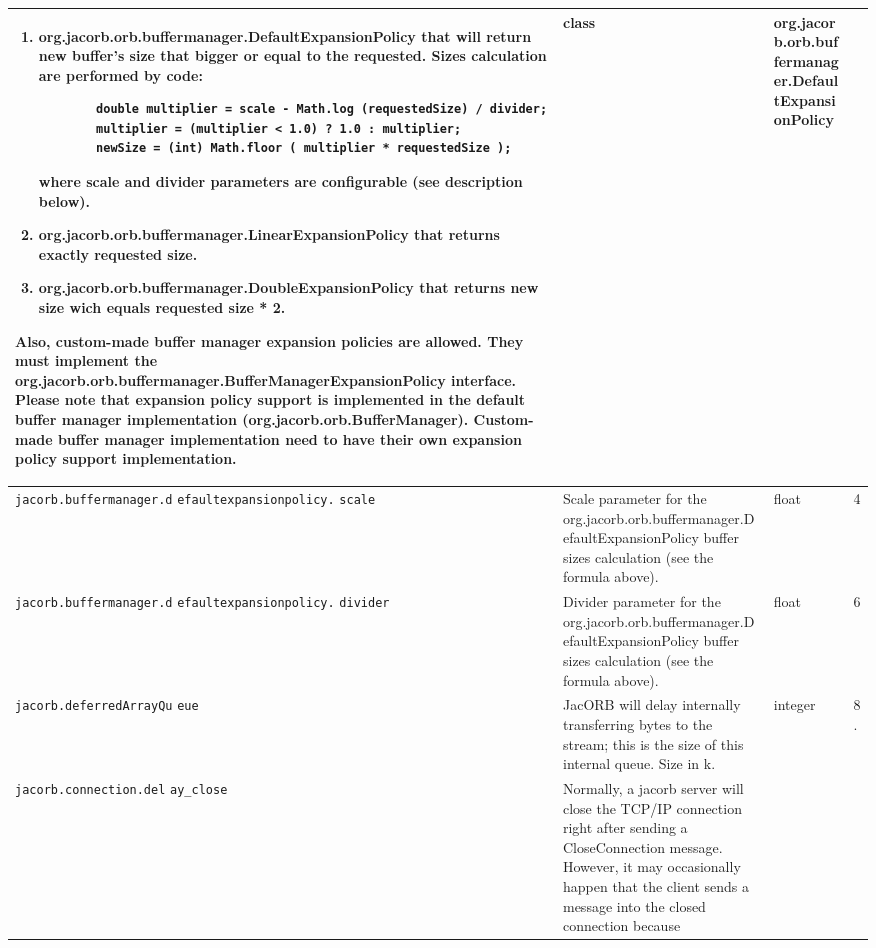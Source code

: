 \begin{small}
\begin{longtable}{|p{5cm}|p{7.5cm}|p{1.5cm}|p{1.5cm}|}
\begin{enumerate}
\item org.jacorb.orb.buffermanager.DefaultExpansionPolicy that will
    return new buffer's size that bigger or equal to the requested.
    Sizes calculation are performed by code:
\begin{small}
\begin{verbatim}
        double multiplier = scale - Math.log (requestedSize) / divider;
        multiplier = (multiplier < 1.0) ? 1.0 : multiplier;
        newSize = (int) Math.floor ( multiplier * requestedSize );
\end{verbatim}
\end{small}
     where scale and divider parameters are configurable (see description
     below).
\item org.jacorb.orb.buffermanager.LinearExpansionPolicy that returns exactly
     requested size.
\item org.jacorb.orb.buffermanager.DoubleExpansionPolicy that returns new
     size wich equals requested size * 2.
\end{enumerate}
Also, custom-made buffer manager expansion policies are allowed. They must
implement the org.jacorb.orb.buffermanager.BufferManagerExpansionPolicy
interface. Please note that expansion policy support is implemented in the
default buffer manager implementation (org.jacorb.orb.BufferManager).
Custom-made buffer manager implementation need to have their own expansion
policy support implementation.
& class & org.jacorb.orb.buffermanager.DefaultExpansionPolicy \\
\hline
\verb"jacorb.buffermanager.d"
\verb"efaultexpansionpolicy."
\verb"scale" & Scale parameter for the org.jacorb.orb.buffermanager.DefaultExpansionPolicy
buffer sizes calculation (see the formula above).
 & float & 4 \\
\hline
\verb"jacorb.buffermanager.d"
\verb"efaultexpansionpolicy."
\verb"divider" & Divider parameter for the org.jacorb.orb.buffermanager.DefaultExpansionPolicy
buffer sizes calculation (see the formula above).
 & float & 6 \\
\hline
\verb"jacorb.deferredArrayQu"
\verb"eue" & JacORB will delay internally transferring bytes to the stream;
this is the size of this internal queue. Size in k. & integer & 8. \\
\hline
\verb"jacorb.connection.del"
\verb"ay_close" & Normally, a jacorb server will close the TCP/IP connection
right after sending a CloseConnection message. However, it may occasionally
happen that the client sends a message into the closed connection because

\end{longtable}
\end{small}
